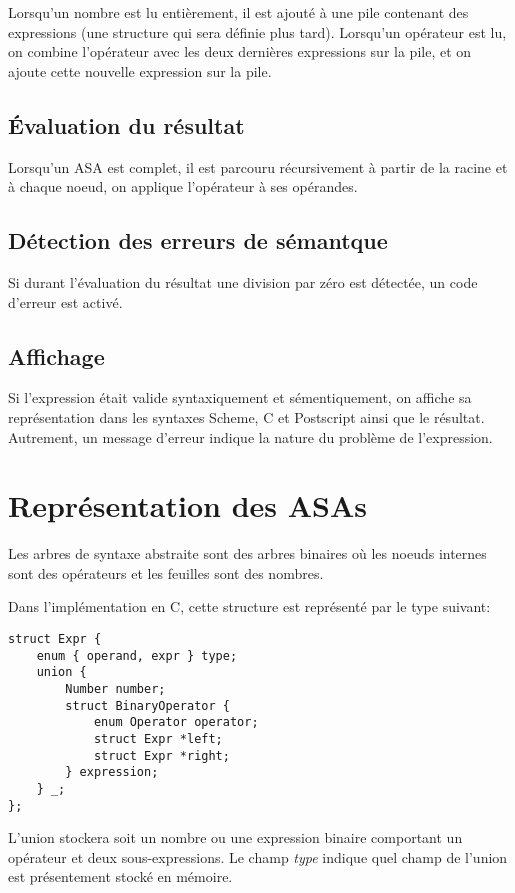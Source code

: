 \documentclass[10pt]{report}
\begin{document}
Lorsqu'un nombre est lu entièrement, il est ajouté à une pile
contenant des expressions (une structure qui sera définie plus tard).
Lorsqu'un opérateur est lu, on combine l'opérateur avec les deux
dernières expressions sur la pile, et on ajoute cette nouvelle
expression sur la pile.

\subsection{Évaluation du résultat}

Lorsqu'un ASA est complet, il est parcouru récursivement à partir de
la racine et à chaque noeud, on applique l'opérateur à ses opérandes.

\subsection{Détection des erreurs de sémantque}

Si durant l'évaluation du résultat une division par zéro est détectée,
un code d'erreur est activé.

\subsection{Affichage}

Si l'expression était valide syntaxiquement et sémentiquement, on
affiche sa représentation dans les syntaxes Scheme, C et Postscript
ainsi que le résultat.  Autrement, un message d'erreur indique la
nature du problème de l'expression.


\section{Représentation des ASAs}

Les arbres de syntaxe abstraite sont des arbres binaires où les noeuds
internes sont des opérateurs et les feuilles sont des nombres.

Dans l'implémentation en C, cette structure est représenté par le type
suivant:

\begin{verbatim}
struct Expr {
	enum { operand, expr } type;
	union {
		Number number;
		struct BinaryOperator {
			enum Operator operator;
			struct Expr *left;
			struct Expr *right;
		} expression;
	} _;
};
\end{verbatim}

L'union stockera soit un nombre ou une expression binaire comportant
un opérateur et deux sous-expressions.  Le champ \emph{type} indique
quel champ de l'union est présentement stocké en mémoire.
\end{document}

